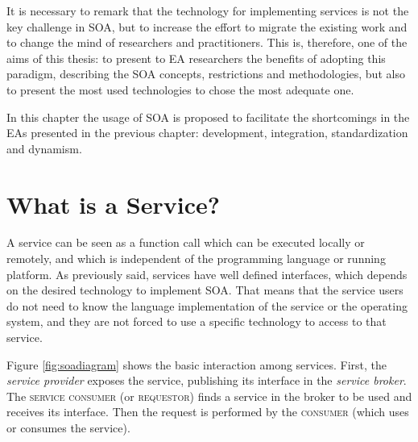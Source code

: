 It is necessary to remark that the technology for implementing services is not the
key challenge in SOA, but to increase the effort to migrate the
existing work and to change the mind of researchers and
practitioners. This is, therefore, one of the aims of this thesis: to  
present to EA researchers the benefits of adopting this paradigm, describing the SOA concepts,
restrictions and methodologies, but also to present the most
used technologies to chose the most adequate one.

In this chapter the usage of SOA is proposed to facilitate the shortcomings in the EAs presented in the previous chapter: development, integration, standardization and dynamism. %


\section{What is a Service?}
\label{sec:soa:whatis}
\lettrine{A}{} service can be seen as a function call which can be
executed locally or remotely, and which is independent of the
programming language or running platform. As previously said, services have well defined
interfaces, which depends on the desired technology to implement
SOA. That means that the service users do not need to know the
language implementation of the service or the operating system, %
 and they are not forced to use a specific technology to access to that service.






Figure \ref{fig:soadiagram} shows the basic interaction among
services. First, the {\em service provider} exposes the service, publishing
its interface in the {\em service broker}. The \textsc{service consumer} (or
\textsc{requestor}) finds  a service in the broker to be used and receives its
interface. Then the request is performed by the \textsc{consumer} (which uses or
consumes the service).  

